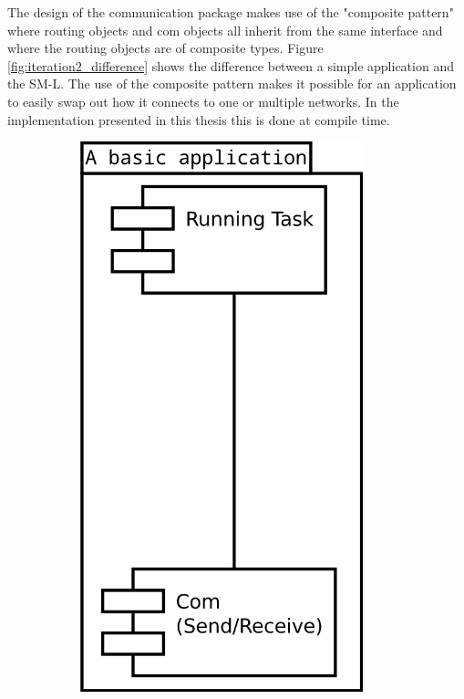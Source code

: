 The design of the communication package makes use of the "composite
pattern" where routing objects and com objects all inherit from the same
interface and where the routing objects are of composite types. Figure
\ref{fig:iteration2_difference} shows the difference between a simple
application and the SM-L. The use of the composite pattern makes it possible
for an application to easily swap out how it connects to one or multiple
networks. In the implementation presented in this thesis this is done at
compile time.

\begin{figure}[h]
    \begin{subfigure}[b]{0.5\linewidth}
        \centering
            \includegraphics[width=0.9\textwidth]{figures/iteration2_uml_basic_application}

\end{subfigure}
\end{figure}
